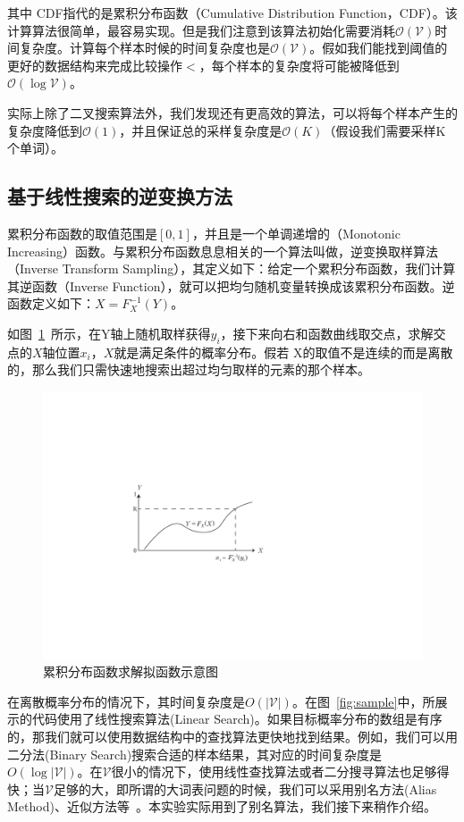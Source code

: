 其中 CDF指代的是累积分布函数（Cumulative Distribution Function，CDF）。该计算算法很简单，最容易实现。但是我们注意到该算法初始化需要消耗$\mathcal{O(\mathcal{V})}$时间复杂度。计算每个样本时候的时间复杂度也是$\mathcal{O(V)}$。假如我们能找到阈值的更好的数据结构来完成比较操作$<$，每个样本的复杂度将可能被降低到$\mathcal{O}(\log\mathcal{V})$。

实际上除了二叉搜索算法外，我们发现还有更高效的算法，可以将每个样本产生的复杂度降低到$\mathcal {O}(1)$，并且保证总的采样复杂度是$\mathcal{O}(K)$（假设我们需要采样K个单词）。
\subsection{基于线性搜索的逆变换方法}
累积分布函数的取值范围是$[0,1]$，并且是一个单调递增的（Monotonic Increasing）函数。与累积分布函数息息相关的一个算法叫做，逆变换取样算法（Inverse Transform Sampling），其定义如下：给定一个累积分布函数，我们计算其逆函数（Inverse Function），就可以把均匀随机变量转换成该累积分布函数。逆函数定义如下：$X=F_X^{-1}(Y)$。

如图~\ref{fig:cdf}~所示，在Y轴上随机取样获得$y_i$，接下来向右和函数曲线取交点，求解交点的$X$轴位置$x_i$，$X$就是满足条件的概率分布。假若 X的取值不是连续的而是离散的，那么我们只需快速地搜索出超过均匀取样的元素的那个样本。
\begin{figure}[!h]
  \centering
\includegraphics[width=0.6\linewidth]{./figures/inverse.pdf}
\caption{累积分布函数求解拟函数示意图}\label{fig:cdf}
\end{figure}

在离散概率分布的情况下，其时间复杂度是$O( |\mathcal{V}|)$。在图~\ref{fig:sample}中，所展示的代码使用了线性搜索算法(Linear Search)。如果目标概率分布的数组是有序的，那我们就可以使用数据结构中的查找算法更快地找到结果。例如，我们可以用二分法(Binary Search)搜索合适的样本结果，其对应的时间复杂度是~$O(\log |\mathcal{V}|)$。在$\mathcal{V}$很小的情况下，使用线性查找算法或者二分搜寻算法也足够得快；当$\mathcal{V}$足够的大，即所谓的大词表问题的时候，我们可以采用别名方法(Alias Method)、近似方法等~。本实验实际用到了别名算法，我们接下来稍作介绍。
